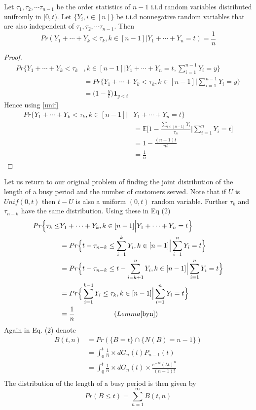 \documentclass[a4paper,english,12pt]{article}
\begin{document}
\begin{lem}\label{byn}
Let $\tau_1, \tau_2, \cdots \tau_{n-1}$ be the order statistics of $n-1$ i.i.d random variables distributed unifromly in $[0,t)$. Let $\{Y_i,i\in [n]\}$	be i.i.d nonnegative random variables that are also independent of $\tau_1, \tau_2, \cdots \tau_{n-1}$. Then
\begin{equation*}
Pr(Y_1+\cdots+Y_k<\tau_k,k \in [n-1] | Y_1+\cdots+Y_n=t)=\frac{1}{n}
\end{equation*}
\end{lem}
\begin{proof}
	\begin{align*}
		Pr\Big\{Y_1+\cdots+Y_k<\tau_k&,k \in [n-1] \Big| Y_1+\cdots+Y_n=t, \sum_{i=1}^{n-1}Y_i=y\Big\}\\
		&= Pr\Big\{Y_1+\cdots+Y_k<\tau_k,k \in [n-1] \Big| \sum_{i=1}^{n-1}Y_i=y\Big\}\\
		&=\Big(1-\frac{y}{t}\Big) \textbf{1}_{y<t}
	\end{align*}
Hence using \ref{unif}
\begin{align*}
	Pr\Big\{Y_1+\cdots+Y_k<\tau_k,k \in [n-1] \Big|& Y_1+\cdots+Y_n=t\Big\}\\
	&= \mathbb{E}\Bigg[1-\frac{\sum_{i \in [n-1]}Y_i}{\tau_n} \Big| \sum_{i=1}^{n}Y_i=t\Bigg]\\
	&= 1-\frac{(n-1)t}{nt}\\
	&=\frac{1}{n}
\end{align*}
\end{proof}
Let us return to our original problem of finding the joint distribution of the length of a busy period and the number of customers served. Note that if $U$ is $Unif(0,t)$ then $t-U$ is also a uniform $(0,t)$ random variable. Further $\tau_k$ and $\tau_{n-k}$ have the same distribution. Using these in Eq (2) 
\begin{align*}
	Pr\Big\{\tau_k \leq & Y_1+\cdots + Y_k, k \in [n-1]\Big|Y_1+\cdots+Y_n=t\Big\}\\
	&= Pr\Big\{t-\tau_{n-k} \leq \sum_{i=1}^{k}Y_i,k \in[n-1] \Big| \sum_{i=1}^{n}Y_i=t\Big\}\\
	&=Pr\Big\{t-\tau_{n-k} \leq t- \sum_{i=k+1}^{n}Y_i,k \in[n-1] \Big| \sum_{i=1}^{n}Y_i=t\Big\}\\
	&=Pr\Big\{\sum_{i=1}^{k-1}Y_i \leq \tau_k, k\in [n-1]\Big|\sum_{i=1}^{n}Y_i=t\Big\}\\
	&=\frac{1}{n}\hspace{2cm} (Lemma \ref{byn})
\end{align*}
Again in Eq. (2) denote 
\begin{align*}
	B(t,n)&=Pr(\{B=t\}  \cap \{N(B)=n-1\})\\
&= 	\int_{0}^{t}\frac{1}{n}\times dG_n(t) P_{n-1}(t)\\
&= \int_{0}^{t}\frac{1}{n}\times dG_n(t)\times \frac{e^{-\lambda t}(\lambda t)^n}{(n-1)!}\\
\end{align*}
The distribution of the length of a busy period is then given by
\begin{equation}
Pr(B\leq t)=\sum_{n=1}^{\infty}B(t,n)
\end{equation}
\end{document}
